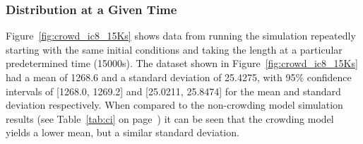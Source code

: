 \documentclass[titlepage]{article}
\begin{document}
\subsubsection{Distribution at a Given Time}
Figure~\ref{fig:crowd_ic8_15Ks} shows data from running the simulation repeatedly starting with the same initial conditions and taking the length at a particular predetermined time (15000s).
The dataset shown in Figure~\ref{fig:crowd_ic8_15Ks} had a mean of 1268.6 and a standard deviation of 25.4275,
with 95\% confidence intervals of [1268.0, 1269.2] and [25.0211, 25.8474] for the mean and standard deviation respectively.
When compared to the non-crowding model simulation results (see Table~\ref{tab:ci} on page~\pageref{tab:ci}) it can be seen that the crowding model yields a lower mean, but a similar standard deviation.



\end{document}
